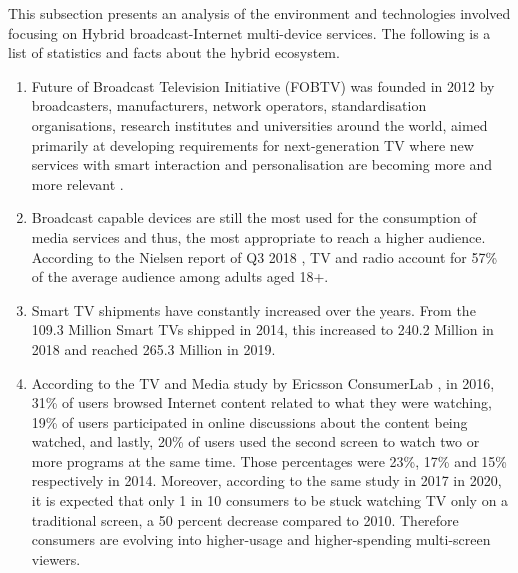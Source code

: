 This subsection presents an analysis of the environment and technologies involved focusing on Hybrid broadcast-Internet multi-device services. The following is a list of statistics and facts about the hybrid ecosystem.
\begin{enumerate}
	\item Future of Broadcast Television Initiative (FOBTV) was founded in 2012 by broadcasters, manufacturers, network operators, standardisation organisations, research institutes and universities around the world, aimed primarily at developing requirements for next-generation TV where new services with smart interaction and personalisation are becoming more and more relevant \cite{Zang2014}.
	\item Broadcast capable devices are still the most used for the consumption of media services and thus, the most appropriate to reach a higher audience. According to the Nielsen report of Q3 2018 \cite{nielsen2018}, TV and radio account for 57\% of the average audience among adults aged 18+.
	\item Smart TV shipments \cite{statistaWeb} have constantly increased over the years. From the 109.3 Million Smart TVs shipped in 2014, this increased to 240.2 Million in 2018 and reached 265.3 Million in 2019.
	\item According to the TV and Media study \cite{ericsson16} by Ericsson ConsumerLab , in 2016, 31\% of users browsed Internet content related to what they were watching, 19\% of users participated in online discussions about the content being watched, and lastly, 20\% of users used the second screen to watch two or more programs at the same time. Those percentages were 23\%, 17\% and 15\% respectively in 2014. Moreover, according to the same study in 2017 \cite{ericsson17} in 2020, it is expected that only 1 in 10 consumers to be stuck watching TV only on a traditional screen, a 50 percent decrease compared to 2010. Therefore consumers are evolving into higher-usage and higher-spending multi-screen viewers. 
\end{enumerate}

